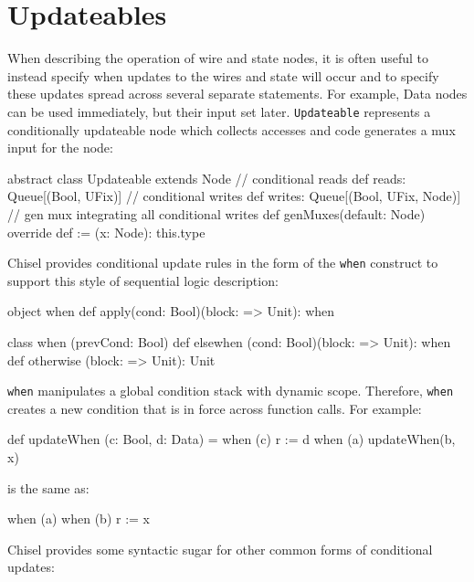 \documentclass[10pt,twocolumn]{article}
\def\code#1{{\small\tt #1}}
\begin{document}
\section{Updateables}

\label{sec:wires}

When describing the operation of wire and state
nodes, it is often useful to instead specify when updates to the
wires and state will occur and to specify these updates spread across
several separate statements.  
For example, Data nodes can be used immediately, but their input set later.
\code{Updateable} represents a conditionally updateable node which
collects accesses and code generates a mux input for the node:

\begin{scala}
abstract class Updateable extends Node {
  // conditional reads
  def reads: Queue[(Bool, UFix)]
  // conditional writes
  def writes: Queue[(Bool, UFix, Node)]
  // gen mux integrating all conditional writes
  def genMuxes(default: Node)
  override def := (x: Node): this.type
}
\end{scala}

Chisel provides conditional update rules
in the form of the \code{when} construct to support this style of
sequential logic description:
 
\begin{scala}
object when {
  def apply(cond: Bool)(block: => Unit): when
}

class when (prevCond: Bool) {
  def elsewhen (cond: Bool)(block: => Unit): when
  def otherwise (block: => Unit): Unit
}
\end{scala}

\noindent
\code{when} manipulates a global condition stack with dynamic scope.
Therefore, \code{when} creates a new condition that is in force across
function calls.  For example:

\begin{scala}
def updateWhen (c: Bool, d: Data) =
  when (c) { r := d }
when (a) { 
  updateWhen(b, x)
}
\end{scala}

\noindent
is the same as:

\begin{scala}
when (a) { 
  when (b) { r := x } 
}
\end{scala}


Chisel provides some syntactic sugar for other common forms of
conditional updates:
\end{document}
